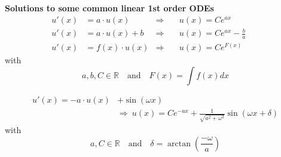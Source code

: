 \textbf{Solutions to some common linear 1st order ODEs}
\begin{align*}
    u'(x) & = a \cdot u(x)     & \Rightarrow & \quad u(x)=Ce^{ax}             &  & \\
    u'(x) & = a \cdot u(x) + b & \Rightarrow & \quad u(x)=Ce^{ax}-\frac{b}{a} &  & \\
    u'(x) & = f(x) \cdot u(x)  & \Rightarrow & \quad u(x) = Ce^{F(x)}         &  &
\end{align*}
with
\begin{equation*}
    a,b,C \in \mathbb{R} \quad \text{and} \quad F(x) = \int f(x)dx
\end{equation*}

\begin{align*}
    u'(x) = -a\cdot u(x) & + \sin(\omega x)                                                                    \\
                         & \Rightarrow \: u(x)=Ce^{-ax}+\frac{1}{\sqrt{a^2 + \omega^2}}\sin(\omega x + \delta)
\end{align*}
with
\begin{equation*}
    a, C \in \mathbb{R} \quad \text{and} \quad  \delta = \arctan\left(\frac{-\omega}{a}\right)
\end{equation*}


